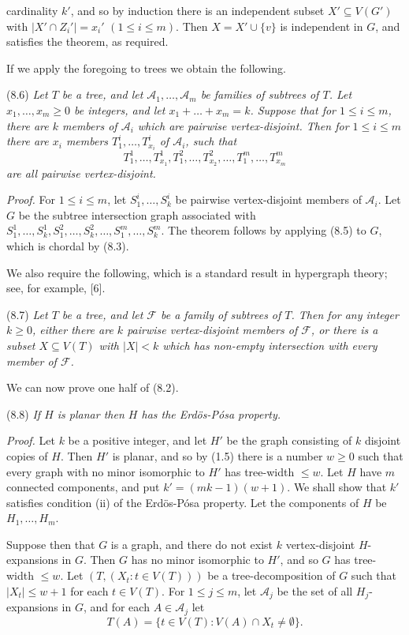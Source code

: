 \noindent cardinality $k'$, and so by induction there is an independent subset $X' \subseteq V(G')$ with $|X' \cap Z_i'| = x_i'$ $(1 \le i \le m)$. Then $X = X' \cup \{v\}$ is independent in $G$, and satisfies the theorem, as required.

If we apply the foregoing to trees we obtain the following.

\stmt
(8.6) \textit{Let $T$ be a tree, and let $\mathcal{A}_1, \dots, \mathcal{A}_m$ be families of subtrees of $T$. Let $x_1, \dots, x_m \ge 0$ be integers, and let $x_1 + \dots + x_m = k$. Suppose that for $1 \le i \le m$, there are $k$ members of $\mathcal{A}_i$ which are pairwise vertex-disjoint. Then for $1 \le i \le m$ there are $x_i$ members $T_1^i, \dots, T_{x_i}^i$ of $\mathcal{A}_i$, such that}
\begin{equation*}
T_1^1, \dots, T_{x_1}^1, T_1^2, \dots, T_{x_2}^2, \dots, T_1^m, \dots, T_{x_m}^m
\end{equation*}
\textit{are all pairwise vertex-disjoint.}

\textit{Proof.} For $1 \le i \le m$, let $S_1^i, \dots, S_k^i$ be pairwise vertex-disjoint members of $\mathcal{A}_i$. Let $G$ be the subtree intersection graph associated with $S_1^1, \dots, S_k^1, S_1^2, \dots, S_k^2, \dots, S_1^m, \dots, S_k^m$. The theorem follows by applying (8.5) to $G$, which is chordal by (8.3).

We also require the following, which is a standard result in hypergraph theory; see, for example, [6].

\stmt
(8.7) \textit{Let $T$ be a tree, and let $\mathcal{F}$ be a family of subtrees of $T$. Then for any integer $k \ge 0$, either there are $k$ pairwise vertex-disjoint members of $\mathcal{F}$, or there is a subset $X \subseteq V(T)$ with $|X| < k$ which has non-empty intersection with every member of $\mathcal{F}$.}

We can now prove one half of (8.2).

\stmt
(8.8) \textit{If $H$ is planar then $H$ has the Erd\"os-P\'osa property.}

\textit{Proof.} Let $k$ be a positive integer, and let $H'$ be the graph consisting of $k$ disjoint copies of $H$. Then $H'$ is planar, and so by (1.5) there is a number $w \ge 0$ such that every graph with no minor isomorphic to $H'$ has tree-width $\le w$. Let $H$ have $m$ connected components, and put $k' = (mk - 1)(w + 1)$. We shall show that $k'$ satisfies condition (ii) of the Erd\"os-P\'osa property. Let the components of $H$ be $H_1, \dots, H_m$.

Suppose then that $G$ is a graph, and there do not exist $k$ vertex-disjoint $H$-expansions in $G$. Then $G$ has no minor isomorphic to $H'$, and so $G$ has tree-width $\le w$. Let $(T, (X_t : t \in V(T)))$ be a tree-decomposition of $G$ such that $|X_t| \le w + 1$ for each $t \in V(T)$. For $1 \le j \le m$, let $\mathcal{A}_j$ be the set of all $H_j$-expansions in $G$, and for each $A \in \mathcal{A}_j$ let
\begin{equation*}
T(A) = \{t \in V(T) : V(A) \cap X_t \ne \emptyset\}.
\end{equation*}

